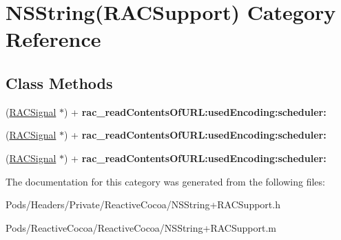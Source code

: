 \hypertarget{category_n_s_string_07_r_a_c_support_08}{}\section{N\+S\+String(R\+A\+C\+Support) Category Reference}
\label{category_n_s_string_07_r_a_c_support_08}
\subsection*{Class Methods}
\begin{DoxyCompactItemize}
\item 
\mbox{\label{category_n_s_string_07_r_a_c_support_08_a323803f8320f2f382d5eebf5236afdda}} 
(\mbox{\hyperlink{interface_r_a_c_signal}{R\+A\+C\+Signal}} $\ast$) + {\bfseries rac\+\_\+read\+Contents\+Of\+U\+R\+L\+:used\+Encoding\+:scheduler\+:}
\item 
\mbox{\label{category_n_s_string_07_r_a_c_support_08_a323803f8320f2f382d5eebf5236afdda}} 
(\mbox{\hyperlink{interface_r_a_c_signal}{R\+A\+C\+Signal}} $\ast$) + {\bfseries rac\+\_\+read\+Contents\+Of\+U\+R\+L\+:used\+Encoding\+:scheduler\+:}
\item 
\mbox{\label{category_n_s_string_07_r_a_c_support_08_a323803f8320f2f382d5eebf5236afdda}} 
(\mbox{\hyperlink{interface_r_a_c_signal}{R\+A\+C\+Signal}} $\ast$) + {\bfseries rac\+\_\+read\+Contents\+Of\+U\+R\+L\+:used\+Encoding\+:scheduler\+:}
\end{DoxyCompactItemize}


The documentation for this category was generated from the following files\+:\begin{DoxyCompactItemize}
\item 
Pods/\+Headers/\+Private/\+Reactive\+Cocoa/N\+S\+String+\+R\+A\+C\+Support.\+h\item 
Pods/\+Reactive\+Cocoa/\+Reactive\+Cocoa/N\+S\+String+\+R\+A\+C\+Support.\+m\end{DoxyCompactItemize}
